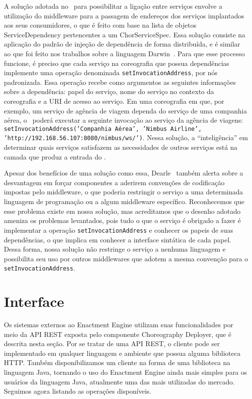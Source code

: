 A solução adotada no \ee\ para possibilitar a ligação entre serviços envolve a utilização do middleware para a passagem de endereços dos serviços implantados aos seus consumidores, o que é feito com base na lista de objetos \textsf{ServiceDependency} pertencentes a um \textsf{ChorServiceSpec}. Essa solução consiste na aplicação do padrão de injeção de dependência de forma distribuída, e é similar ao que foi feito nos trabalhos sobre a linguagem Darwin~\cite{Magee1996Dynamic, Magee1994Regis}. Para que esse processo funcione, é preciso que cada serviço na coreografia que possua dependências implemente uma operação denominada \texttt{setInvocationAddress}, por nós padronizada. Essa operação recebe como argumentos as seguintes informações sobre a dependência: papel do serviço, nome do serviço no contexto da coreografia e a URI de acesso ao serviço.  Em uma coreografia em que, por exemplo, um serviço de agência de viagem dependa do serviço de uma companhia aérea, o \ee\ poderá executar a seguinte invocação ao serviço da agência de viagens: \texttt{setInvocationAddress('Companhia Aérea', 'Nimbus Airline', \\ 'http://192.168.56.107:8080/nimbus/ws/')}. Nessa solução, a ``inteligência'' em determinar quais serviços satisfazem as necessidades de outros serviços está na camada que produz a entrada do \ee.

Apesar dos benefícios de uma solução como essa, Dearle~\cite{Dearle2007PastPresentFuture} também alerta sobre a desvantagem em forçar componentes a aderirem convenções de codificação impostas pelo middleware, o que poderia restringir o serviço a uma determinada linguagem de programação ou a algum middleware específico. Reconhecemos que esse problema existe em nossa solução, mas acreditamos que o desenho adotado ameniza os problemas levantados, pois tudo o que o serviço é obrigado a fazer é implementar a operação \texttt{setInvocationAddress} e conhecer os papeis de suas dependências, o que implica em conhecer a interface sintática de cada papel. Dessa forma, nossa solução não restringe o serviço a nenhuma linguagem e possibilita seu uso por outros middlewares que adotem a mesma convenção para o \texttt{setInvocationAddress}.

\section{Interface}
\label{sec:interface}

Os sistemas externos ao Enactment Engine utilizam suas funcionalidades por meio da API REST exposta pelo componente Choreography Deployer, que é descrita nesta seção. Por se tratar de uma API REST, o cliente pode ser implementado em qualquer linguagem e ambiente que possua alguma biblioteca HTTP. Também disponibilizamos um cliente na forma de uma biblioteca na linguagem Java, tornando o uso do Enactment Engine ainda mais simples para os usuários da linguagem Java, atualmente uma das mais utilizadas do mercado. Seguimos agora listando as operações disponíveis. 

